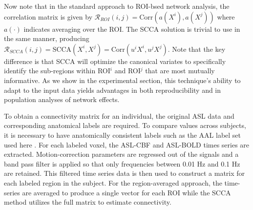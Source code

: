 \documentclass{llncs}
\begin{document}
Now note that in the standard approach to ROI-bsed network analysis, the correlation matrix is given by $\mathcal{R}_{ROI}(i,j)=\text{Corr}( a(X^i), a(X^j) )$ where $a(\cdot)$ indicates averaging over the ROI.   The SCCA solution is trivial to use in the same manner, producing  $\mathcal{R}_{SCCA}(i,j)=\text{SCCA}( X^i, X^j ) = \text{Corr}( u^i X^i , u^j X^j )$.  Note that the key difference is that SCCA will optimize the canonical variates to specifically identify the sub-regions within ROI$^i$ and ROI$^j$ that are most mutually informative.  As we show in the experimental section, this technique's ability to adapt to the input data yields advantages in both reproducibility and in population analyses of network effects.  

To obtain a connectivity matrix for an individual, the original ASL data and corresponding anatomical labels are required. To compare values across subjects, it is necessary to have anatomically consistent labels such as the AAL label set used here \cite{Tzourio-Mazoyer2002}. For each labeled voxel, the ASL-CBF and ASL-BOLD times series are extracted. Motion-correction parameters are regressed out of the signals and a band pass filter is applied so that only frequencies between 0.01 Hz and 0.1 Hz are retained. This filtered time series data is then used to construct a matrix for each labeled region in the subject. For the region-averaged approach, the time-series are averaged to produce a single vector for each ROI while the SCCA method utilizes the full matrix to estimate connectivity.

\end{document}
